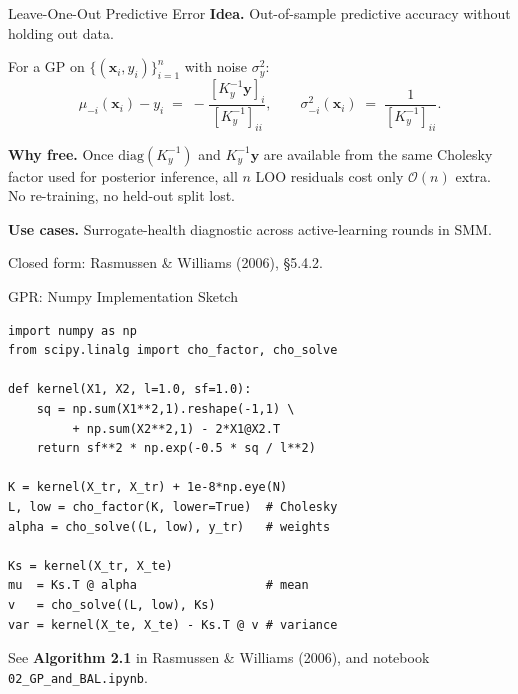 \documentclass[aspectratio=169,11pt]{beamer}
\newcommand{\x}{\bm{x}}
\begin{document}
\begin{frame}{Leave-One-Out Predictive Error}
\textbf{Idea.} Out-of-sample predictive accuracy without holding out data.

\smallskip
For a GP on $\{(\x_i, y_i)\}_{i=1}^n$ with noise $\sigma_y^2$:
\begin{equation*}
\mu_{-i}(\x_i) - y_i \;=\; -\frac{[K_y^{-1}\bm y]_i}{[K_y^{-1}]_{ii}}, \qquad
\sigma_{-i}^2(\x_i) \;=\; \frac{1}{[K_y^{-1}]_{ii}}.
\end{equation*}

\smallskip
\textbf{Why free.} Once $\mathrm{diag}(K_y^{-1})$ and $K_y^{-1}\bm y$ are available from the same Cholesky factor used for posterior inference, all $n$ LOO residuals cost only $\mathcal O(n)$ extra. No re-training, no held-out split lost.

\smallskip
\textbf{Use cases.} Surrogate-health diagnostic across active-learning rounds in SMM.

\medskip
{\scriptsize Closed form: Rasmussen \& Williams (2006), \S5.4.2.}
\end{frame}

\begin{frame}[fragile]{GPR: Numpy Implementation Sketch}
\begin{lstlisting}[basicstyle=\footnotesize\ttfamily]
import numpy as np
from scipy.linalg import cho_factor, cho_solve

def kernel(X1, X2, l=1.0, sf=1.0):
    sq = np.sum(X1**2,1).reshape(-1,1) \
         + np.sum(X2**2,1) - 2*X1@X2.T
    return sf**2 * np.exp(-0.5 * sq / l**2)

K = kernel(X_tr, X_tr) + 1e-8*np.eye(N)
L, low = cho_factor(K, lower=True)  # Cholesky
alpha = cho_solve((L, low), y_tr)   # weights

Ks = kernel(X_tr, X_te)
mu  = Ks.T @ alpha                  # mean
v   = cho_solve((L, low), Ks)
var = kernel(X_te, X_te) - Ks.T @ v # variance
\end{lstlisting}

{\scriptsize See \textbf{Algorithm 2.1} in Rasmussen \& Williams (2006), and notebook \texttt{02\_GP\_and\_BAL.ipynb}.}
\end{frame}
\end{document}
